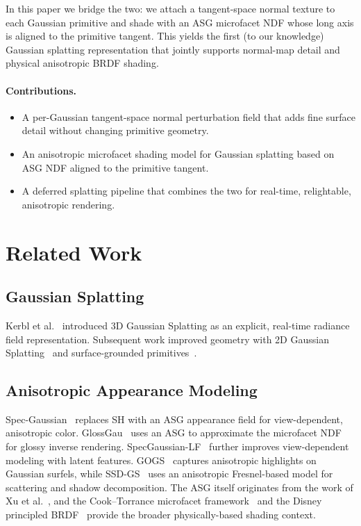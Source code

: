\documentclass[acmtog, review=true, authorversion=false]{acmart}
\begin{document}
In this paper we bridge the two: we attach a tangent-space normal
texture to each Gaussian primitive and shade with an ASG microfacet
NDF whose long axis is aligned to the primitive tangent. This yields
the first (to our knowledge) Gaussian splatting representation that
jointly supports normal-map detail and physical anisotropic BRDF
shading.

\paragraph{Contributions.}
\begin{itemize}
  \item A per-Gaussian tangent-space normal perturbation field that
        adds fine surface detail without changing primitive geometry.
  \item An anisotropic microfacet shading model for Gaussian splatting
        based on ASG NDF aligned to the primitive tangent.
  \item A deferred splatting pipeline that combines the two for
        real-time, relightable, anisotropic rendering.
\end{itemize}

\section{Related Work}\label{sec:related}

\subsection{Gaussian Splatting}
Kerbl et al.~\cite{kerbl3Dgaussians} introduced 3D Gaussian Splatting
as an explicit, real-time radiance field representation. Subsequent
work improved geometry with 2D Gaussian Splatting~\cite{2dgaussians}
and surface-grounded primitives~\cite{geosplatting}.

\subsection{Anisotropic Appearance Modeling}
Spec-Gaussian~\cite{specgaussian} replaces SH with an ASG appearance
field for view-dependent, anisotropic color. GlossGau~\cite{glossgau}
uses an ASG to approximate the microfacet NDF for glossy inverse
rendering. SpecGaussian-LF~\cite{specgaussianlf} further improves
view-dependent modeling with latent features. GOGS~\cite{gogs}
captures anisotropic highlights on Gaussian surfels, while
SSD-GS~\cite{ssdgs} uses an anisotropic Fresnel-based model for
scattering and shadow decomposition. The ASG itself originates from
the work of Xu et al.~\cite{xu2013anisg}, and the Cook--Torrance
microfacet framework~\cite{cooktorrance,walter2007microfacet} and
the Disney principled BRDF~\cite{burley2012disney} provide the
broader physically-based shading context.
\end{document}

